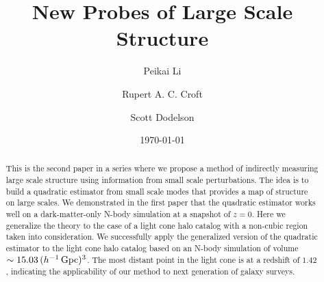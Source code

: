 \documentclass[prd,amsmath,amssymb,floatfix,superscriptaddress,nofootinbib,twocolumn]{revtex4-1}
\begin{document}
\title{New Probes of Large Scale Structure}
\author{\large Peikai Li}
\author{\large Rupert A. C. Croft}
\author{\large Scott Dodelson}
\date{\today}


\begin{abstract}
\noindent This is the second paper in a series where we propose a method of indirectly measuring large scale structure using information from small scale perturbations. The idea is to build a quadratic estimator from small scale modes that provides a map of structure on large scales.
We demonstrated in the first paper that the quadratic estimator works well on a dark-matter-only N-body simulation at a snapshot of $z=0$. Here we generalize the theory to the case of a light cone halo catalog with a non-cubic region taken into consideration. We successfully apply the generalized version of the quadratic estimator to the light cone halo catalog based on an N-body simulation of volume $\sim15.03\,(h^{-1}\,\rm Gpc)^3$. The most distant point in the light cone is at a redshift of $1.42$, indicating the applicability of our method to next generation of galaxy surveys.
\end{abstract}
\maketitle
\end{document}
